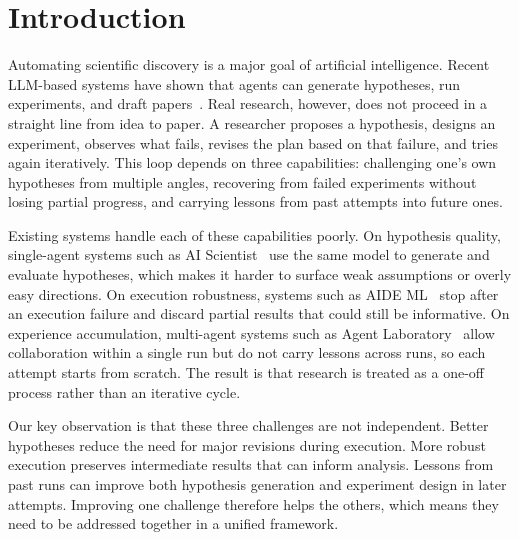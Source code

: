 \vspace{-0.5em}
\section{Introduction}
\label{sec:intro}
\vspace{-0.5em}

Automating scientific discovery is a major goal of artificial intelligence.
Recent LLM-based systems have shown that agents can generate hypotheses, run experiments, and draft papers~\citep{lu2024aiscientist, yamada2025aiscientistv2, schmidgall2025agentlab, tang2025airesearcher}.
Real research, however, does not proceed in a straight line from idea to paper.
A researcher proposes a hypothesis, designs an experiment, observes what fails, revises the plan based on that failure, and tries again iteratively.
This loop depends on three capabilities: challenging one's own hypotheses from multiple angles, recovering from failed experiments without losing partial progress, and carrying lessons from past attempts into future ones.

Existing systems handle each of these capabilities poorly.
On hypothesis quality, single-agent systems such as AI Scientist~\citep{lu2024aiscientist, yamada2025aiscientistv2} use the same model to generate and evaluate hypotheses, which makes it harder to surface weak assumptions or overly easy directions.
On execution robustness, systems such as AIDE ML~\citep{aide2025} stop after an execution failure and discard partial results that could still be informative.
On experience accumulation, multi-agent systems such as Agent Laboratory~\citep{schmidgall2025agentlab} allow collaboration within a single run but do not carry lessons across runs, so each attempt starts from scratch.
The result is that research is treated as a one-off process rather than an iterative cycle.

Our key observation is that these three challenges are not independent.
Better hypotheses reduce the need for major revisions during execution.
More robust execution preserves intermediate results that can inform analysis.
Lessons from past runs can improve both hypothesis generation and experiment design in later attempts.
Improving one challenge therefore helps the others, which means they need to be addressed together in a unified framework.


